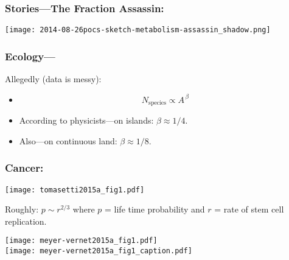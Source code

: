 \begin{frame}
  \frametitle{Stories---The Fraction Assassin:}

  \texttt{[image: 2014-08-26pocs-sketch-metabolism-assassin\_shadow.png]}
\end{frame}


\begin{frame}
  \frametitle{Ecology---}

  \begin{block}{Allegedly (data is messy):\cite{macarthur1963a,levin1992a}}
    \begin{itemize}
    \item 
      $$
      N_{\textrm{species}} \propto A^{\, \beta}
      $$
    \item 
      According to physicists---on islands: $\beta \approx 1/4$.
    \item 
      Also---on continuous land: $\beta \approx 1/8$.
    \end{itemize}
  \end{block}

  

\end{frame}

\begin{frame}
  \frametitle{Cancer:}


  \begin{center}
    \texttt{[image: tomasetti2015a\_fig1.pdf]}
  \end{center}

  Roughly:
  $
  p 
  \sim
  r^{2/3}
  $
  where
  $p$ = life time probability 
  and
  $r$ = rate of stem cell replication.

\end{frame}

\begin{frame}
  
  \begin{block}{}

  \texttt{[image: meyer-vernet2015a\_fig1.pdf]}\\
  \texttt{[image: meyer-vernet2015a\_fig1\_caption.pdf]}
  \end{block}

\end{frame}

